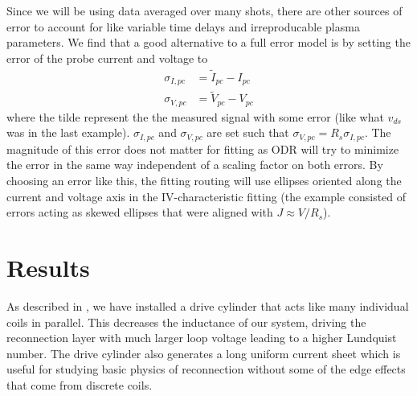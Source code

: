 Since we will be using data averaged over many shots, there are other sources of error to account for like variable time delays and irreproducable plasma parameters. We find that a good alternative to a full error model is by setting the error of the probe current and voltage to
\begin{align*}
    \sigma_{I,pc} &= \tilde{I}_{pc} - I_{pc} \\
    \sigma_{V,pc} &= \tilde{V}_{pc} - V_{pc}
\end{align*}
where the tilde represent the the measured signal with some error (like what $v_{ds}$ was in the last example). $\sigma_{I,pc}$ and $\sigma_{V,pc}$ are set such that $\sigma_{V,pc} = R_s \sigma_{I,pc}$. The magnitude of this error does not matter for fitting as ODR will try to minimize the error in the same way independent of a scaling factor on both errors. By choosing an error like this, the fitting routing will use ellipses oriented along the current and voltage axis in the IV-characteristic fitting (the example consisted of errors acting as skewed ellipses that were aligned with $J \approx V / R_s$).



\section{Results}


As described in \cite{Gradney_Egedal_Barnhill_Flores-García_Greess_Kuchta_Olson_Wallace_Yu_Forest_2023}, we have installed a drive cylinder that acts like many individual coils in parallel. This decreases the inductance of our system, driving the reconnection layer with much larger loop voltage leading to a higher Lundquist number. The drive cylinder also generates a long uniform current sheet which is useful for studying basic physics of reconnection without some of the edge effects that come from discrete coils.

